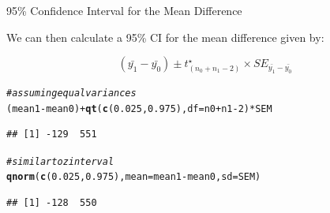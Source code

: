 \documentclass[10pt,handout]{beamer}\usepackage[]{graphicx}\usepackage[]{color}
\makeatletter
\newcommand{\hlnum}[1]{\textcolor[rgb]{0.686,0.059,0.569}{#1}}%
\newcommand{\hlcom}[1]{\textcolor[rgb]{0.678,0.584,0.686}{\textit{#1}}}%
\newcommand{\hlopt}[1]{\textcolor[rgb]{0,0,0}{#1}}%
\newcommand{\hlstd}[1]{\textcolor[rgb]{0.345,0.345,0.345}{#1}}%
\newcommand{\hlkwc}[1]{\textcolor[rgb]{0.333,0.667,0.333}{#1}}%
\newcommand{\hlkwd}[1]{\textcolor[rgb]{0.737,0.353,0.396}{\textbf{#1}}}%
\newenvironment{kframe}{%
 \def\at@end@of@kframe{}%
 \ifinner\ifhmode%
  \def\at@end@of@kframe{\end{minipage}}%
  \begin{minipage}{\columnwidth}%
 \fi\fi%
 \def\FrameCommand##1{\hskip\@totalleftmargin \hskip-\fboxsep
 \colorbox{shadecolor}{##1}\hskip-\fboxsep
     \hskip-\linewidth \hskip-\@totalleftmargin \hskip\columnwidth}%
 \MakeFramed {\advance\hsize-\width
   \@totalleftmargin\z@ \linewidth\hsize
   \@setminipage}}%
 {\par\unskip\endMakeFramed%
 \at@end@of@kframe}
\newenvironment{knitrout}{}{} %
\makeatother
\begin{document}
\begin{frame}[fragile]{95\% Confidence Interval for the Mean Difference}
	
	We can then calculate a 95\% CI for the mean difference given by:
	
	\begin{equation}
		(\bar{y_1} - \bar{y_0}) \pm t^\star_{(n_0 + n_1 - 2)} \times SE_{\bar{y_1} - \bar{y_0}}
	\end{equation}
	
	\pause 
	
\begin{knitrout}\scriptsize
{}\color{fgcolor}\begin{kframe}
\begin{alltt}
\hlcom{# assuming equal variances}
\hlstd{(mean1} \hlopt{-} \hlstd{mean0)} \hlopt{+} \hlkwd{qt}\hlstd{(}\hlkwd{c}\hlstd{(}\hlnum{0.025}\hlstd{,} \hlnum{0.975}\hlstd{),} \hlkwc{df} \hlstd{= n0} \hlopt{+} \hlstd{n1} \hlopt{-} \hlnum{2}\hlstd{)} \hlopt{*} \hlstd{SEM}
\end{alltt}
\begin{verbatim}
## [1] -129  551
\end{verbatim}
\begin{alltt}
\hlcom{# similar to z interval}
\hlkwd{qnorm}\hlstd{(}\hlkwd{c}\hlstd{(}\hlnum{0.025}\hlstd{,} \hlnum{0.975}\hlstd{),} \hlkwc{mean} \hlstd{= mean1} \hlopt{-} \hlstd{mean0,} \hlkwc{sd} \hlstd{= SEM)}
\end{alltt}
\begin{verbatim}
## [1] -128  550
\end{verbatim}
\end{kframe}
\end{knitrout}
	
	
\end{frame}
\end{document}
